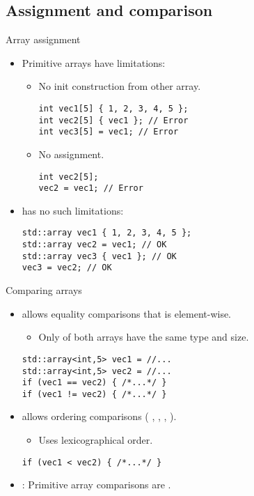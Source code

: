 \subsection{Assignment and comparison}

\begin{frame}[t,fragile]{Array assignment}
\begin{itemize}
  \item Primitive arrays have limitations:
    \begin{itemize}
      \item No init construction from other array.
\begin{lstlisting}
int vec1[5] { 1, 2, 3, 4, 5 };
int vec2[5] { vec1 }; // Error
int vec3[5] = vec1; // Error
\end{lstlisting}
      \item No assignment.
\begin{lstlisting}
int vec2[5];
vec2 = vec1; // Error
\end{lstlisting}
    \end{itemize}

  \item {} has no such limitations:
\begin{lstlisting}
std::array vec1 { 1, 2, 3, 4, 5 };
std::array vec2 = vec1; // OK
std::array vec3 { vec1 }; // OK
vec3 = vec2; // OK
\end{lstlisting}
\end{itemize}
\end{frame}

\begin{frame}[t,fragile]{Comparing arrays}
\begin{itemize}
  \item {} allows equality comparisons that is element-wise.
    \begin{itemize}
      \item Only of both arrays have the same type and size.
    \end{itemize}
\begin{lstlisting}
std::array<int,5> vec1 = //...
std::array<int,5> vec2 = //...
if (vec1 == vec2) { /*...*/ }
if (vec1 != vec2) { /*...*/ }
\end{lstlisting}

  \item {} allows ordering comparisons (
        \cppkey{<}, \cppkey{<=}, \cppkey{>}, \cppkey{>=}).
    \begin{itemize}
      \item Uses lexicographical order.
    \end{itemize}
\begin{lstlisting}
if (vec1 < vec2) { /*...*/ }
\end{lstlisting}

  \item {}: Primitive array comparisons are .
\end{itemize}
\end{frame}
